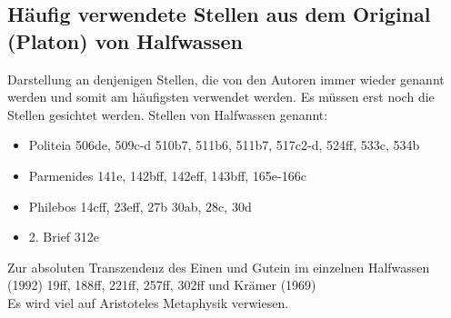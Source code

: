 \documentclass[12pt]{article}
\begin{document}
\subsection{Häufig verwendete Stellen aus dem Original (Platon) von Halfwassen}
Darstellung an denjenigen Stellen, die von den Autoren immer wieder genannt werden und somit am häufigsten verwendet werden. Es müssen erst noch die Stellen gesichtet werden. Stellen von Halfwassen genannt:
\begin{itemize}
    \item {Politeia 506de, 509c-d 510b7, 511b6, 511b7, 517c2-d, 524ff, 533c, 534b}
    \item {Parmenides 141e, 142bff, 142eff, 143bff, 165e-166c}
    \item {Philebos 14cff, 23eff, 27b 30ab, 28c, 30d}
    \item {2. Brief 312e}
\end{itemize}

Zur absoluten Transzendenz des Einen und Gutein im einzelnen Halfwassen (1992) 19ff, 188ff, 221ff, 257ff, 302ff und Krämer (1969)\\
Es wird viel auf Aristoteles Metaphysik verwiesen.
\end{document}
